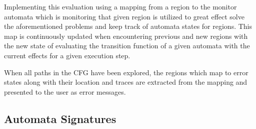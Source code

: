 \newpar Implementing this evaluation using a mapping from a region to the monitor automata which is monitoring that given region is utilized to great effect solve the aforementioned problems and keep track of automata states for regions. This map is continuously updated when encountering previous and new regions with the new state of evaluating the transition function of a given automata with the current effects for a given execution step.

\newpar When all paths  in the CFG have been explored, the regions which map to error states along with their location and traces are extracted from the mapping and presented to the user as error messages. 

\subsection{Automata Signatures}

